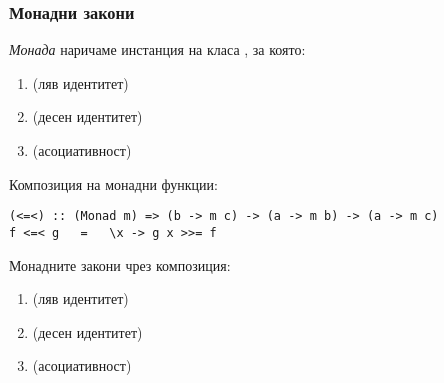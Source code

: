 \documentclass[alsotrans]{beamerswitch}
\begin{document}
\begin{frame}[fragile]
  \frametitle{Монадни закони}
  \begin{definition}
    \emph{Монада} наричаме инстанция на класа , за която:
    \small
    \begin{enumerate}[<+->]
    \item {} \eqv {} (ляв идентитет)
    \item {}   \eqv {}   (десен идентитет)
    \item {} \eqv {} (асоциативност)
    \end{enumerate}
  \end{definition}
  \onslide<+->
  Композиция на монадни функции:\\
\begin{lstlisting}
(<=<) :: (Monad m) => (b -> m c) -> (a -> m b) -> (a -> m c)  
f <=< g   =   \x -> g x >>= f
\end{lstlisting}
  \onslide<+->
  Монадните закони чрез композиция:
  \begin{enumerate}
  \item {} \eqv {} (ляв идентитет)
  \item {} \eqv {} (десен идентитет)
  \item {} \eqv {} (асоциативност)
  \end{enumerate}
\end{frame}
\end{document}
